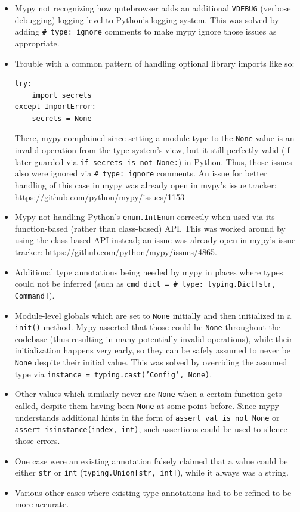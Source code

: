 \documentclass[a4paper,parskip=full]{scrreprt}
\newcommand{\py}[1]{\texttt{#1}}
\begin{document}
\begin{itemize}
  \item Mypy not recognizing how qutebrowser adds an additional \verb|VDEBUG|
    (verbose debugging) logging level to Python's logging system. This was
    solved by adding \py{# type: ignore} comments to make mypy ignore those
    issues as appropriate.
  \item Trouble with a common pattern of handling optional library imports like so:
    \begin{verbatim}
try:
    import secrets
except ImportError:
    secrets = None
\end{verbatim}
    There, mypy complained since setting a module type to the
    \verb|None| value is an invalid operation from the type system's view, but
    it still perfectly valid (if later guarded via \py{if secrets is not None:})
    in Python. Thus, those issues also were ignored via \py{# type: ignore}
    comments. An issue for better handling of this case in mypy was already
    open in mypy's issue tracker: \url{https://github.com/python/mypy/issues/1153}
  \item Mypy not handling Python's \py{enum.IntEnum} correctly when used via
    its function-based (rather than class-based) API. This was worked around by
    using the class-based API instead; an issue was already open in mypy's issue
    tracker: \url{https://github.com/python/mypy/issues/4865}.
  \item Additional type annotations being needed by mypy in places where types
    could not be inferred (such as \texttt{cmd_dict = {} # type: typing.Dict[str, Command]}).
  \item Module-level globals which are set to \py{None} initially and then
    initialized in a \py{init()} method. Mypy asserted that those could be \py{None}
    throughout the codebase (thus resulting in many potentially invalid operations),
    while their initialization happens very early, so they can be safely assumed
    to never be \py{None} despite their initial value. This was solved by
    overriding the assumed type via \py{instance = typing.cast('Config', None)}.
  \item Other values which similarly never are \py{None} when a certain function
    gets called, despite them having been \py{None} at some point before. Since
    mypy understands additional hints in the form of \py{assert val is not
      None} or \py{assert isinstance(index, int)}, such assertions could be used
    to silence those errors.
  \item One case were an existing annotation falsely claimed that a value could
    be either \py{str} or \py{int} (\py{typing.Union[str, int]}), while it
    always was a string.
  \item Various other cases where existing type annotations had to be refined to
    be more accurate.
\end{itemize}
\end{document}
